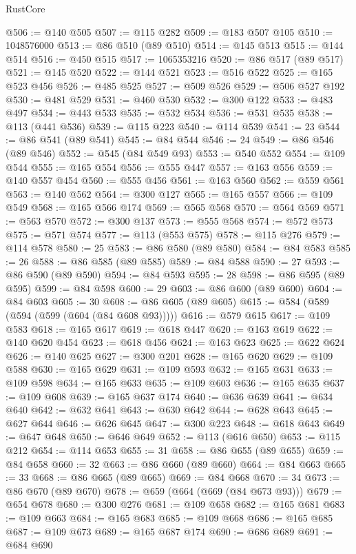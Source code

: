 \begin{lexlean}{RustCore}
\begin{coremodule}
@506 := @140 @505
@507 := @115 @282
@509 := @183 @507 @105
@510 := 1048576000
@513 := @86 @510 (@89 @510)
@514 := @145 @513
@515 := @144 @514
@516 := @450 @515
@517 := 1065353216
@520 := @86 @517 (@89 @517)
@521 := @145 @520
@522 := @144 @521
@523 := @516 @522
@525 := @165 @523 @456
@526 := @485 @525
@527 := @509 @526
@529 := @506 @527 @192
@530 := @481 @529
@531 := @460 @530
@532 := @300 @122
@533 := @483 @497
@534 := @443 @533
@535 := @532 @534
@536 := @531 @535
@538 := @113 (@441 @536)
@539 := @115 @223
@540 := @114 @539
@541 := 23
@544 := @86 @541 (@89 @541)
@545 := @84 @544
@546 := 24
@549 := @86 @546 (@89 @546)
@552 := @545 (@84 @549 @93)
@553 := @540 @552
@554 := @109 @544
@555 := @165 @554
@556 := @555 @447
@557 := @163 @556
@559 := @140 @557 @454
@560 := @555 @456
@561 := @163 @560
@562 := @559 @561
@563 := @140 @562
@564 := @300 @127
@565 := @165 @557
@566 := @109 @549
@568 := @165 @566 @174
@569 := @565 @568
@570 := @564 @569
@571 := @563 @570
@572 := @300 @137
@573 := @555 @568
@574 := @572 @573
@575 := @571 @574
@577 := @113 (@553 @575)
@578 := @115 @276
@579 := @114 @578
@580 := 25
@583 := @86 @580 (@89 @580)
@584 := @84 @583
@585 := 26
@588 := @86 @585 (@89 @585)
@589 := @84 @588
@590 := 27
@593 := @86 @590 (@89 @590)
@594 := @84 @593
@595 := 28
@598 := @86 @595 (@89 @595)
@599 := @84 @598
@600 := 29
@603 := @86 @600 (@89 @600)
@604 := @84 @603
@605 := 30
@608 := @86 @605 (@89 @605)
@615 := @584 (@589 (@594 (@599 (@604 (@84 @608 @93)))))
@616 := @579 @615
@617 := @109 @583
@618 := @165 @617
@619 := @618 @447
@620 := @163 @619
@622 := @140 @620 @454
@623 := @618 @456
@624 := @163 @623
@625 := @622 @624
@626 := @140 @625
@627 := @300 @201
@628 := @165 @620
@629 := @109 @588
@630 := @165 @629
@631 := @109 @593
@632 := @165 @631
@633 := @109 @598
@634 := @165 @633
@635 := @109 @603
@636 := @165 @635
@637 := @109 @608
@639 := @165 @637 @174
@640 := @636 @639
@641 := @634 @640
@642 := @632 @641
@643 := @630 @642
@644 := @628 @643
@645 := @627 @644
@646 := @626 @645
@647 := @300 @223
@648 := @618 @643
@649 := @647 @648
@650 := @646 @649
@652 := @113 (@616 @650)
@653 := @115 @212
@654 := @114 @653
@655 := 31
@658 := @86 @655 (@89 @655)
@659 := @84 @658
@660 := 32
@663 := @86 @660 (@89 @660)
@664 := @84 @663
@665 := 33
@668 := @86 @665 (@89 @665)
@669 := @84 @668
@670 := 34
@673 := @86 @670 (@89 @670)
@678 := @659 (@664 (@669 (@84 @673 @93)))
@679 := @654 @678
@680 := @300 @276
@681 := @109 @658
@682 := @165 @681
@683 := @109 @663
@684 := @165 @683
@685 := @109 @668
@686 := @165 @685
@687 := @109 @673
@689 := @165 @687 @174
@690 := @686 @689
@691 := @684 @690

\end{coremodule}
\end{lexlean}

